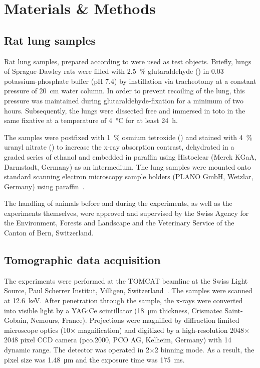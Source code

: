 \documentclass[%
	paper=a4,%
	twoside=true,%
	draft=false,%
	abstract=false]{scrartcl}
\begin{document}
\section{Materials \& Methods}\label{sec:MM}
\subsection{Rat lung samples}
Rat lung samples, prepared according to \cite{Tschanz2002,Luyet2002} were used as test objects. Briefly, lungs of Sprague-Dawley rats were filled with \SI{2.5}{\percent} glutaraldehyde () in \SI{0.03}{\Molar} potassium-phosphate buffer (pH 7.4) by instillation via tracheotomy at a constant pressure of \SI{20}{\centi\meter} water column. In order to prevent recoiling of the lung, this pressure was maintained during glutaraldehyde-fixation for a minimum of two hours. Subsequently, the lungs were dissected free and immersed in toto in the same fixative at a temperature of \SI{4}{\celsius} for at least \SI{24}{\hour}.

The samples were postfixed with \SI{1}{\percent} osmium tetroxide () and stained with \SI{4}{\percent} uranyl nitrate () to increase the x-ray absorption contrast, dehydrated in a graded series of ethanol and embedded in paraffin using Histoclear (Merck KGaA, Darmstadt, Germany) as an intermedium. The lung samples were mounted onto standard scanning electron microscopy sample holders (PLANO GmbH, Wetzlar, Germany) using paraffin~\cite{Tsuda2008}.

The handling of animals before and during the experiments, as well as the experiments themselves, were approved and supervised by the Swiss Agency for the Environment, Forests and Landscape and the Veterinary Service of the Canton of Bern, Switzerland.

\subsection{Tomographic data acquisition}
The experiments were performed at the TOMCAT beamline at the Swiss Light Source, Paul Scherrer Institut, Villigen, Switzerland~\cite{Stampanoni2006a}. The samples were scanned at \SI{12.6}{\kilo\electronvolt}. After penetration through the sample, the x-rays were converted into visible light by a YAG:Ce scintillator (\SI{18}{\micro\meter} thickness, Crismatec Saint-Gobain, Nemours, France). Projections were magnified by diffraction limited microscope optics (10\(\times\) magnification) and digitized by a high-resolution 2048\(\times\)2048 pixel CCD camera (pco.2000, PCO AG, Kelheim, Germany) with \SI{14}{\bit} dynamic range. The detector was operated in 2\(\times\)2 binning mode. As a result, the pixel size was \SI{1.48}{\micro\meter} and the exposure time was \SI{175}{\milli\second}.
\end{document}
